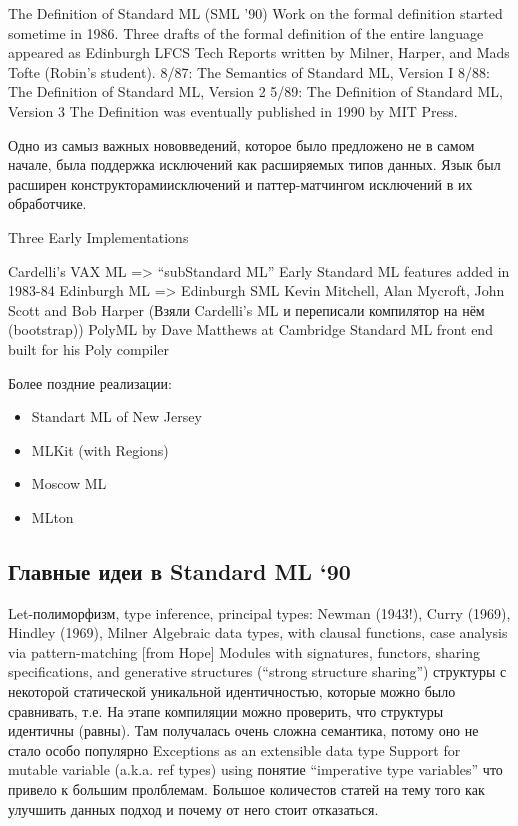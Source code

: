 \documentclass[14pt]{matmex-diploma-custom}
\begin{document}
\begin{itemize}
\begin{itemize}
The Definition of Standard ML (SML ’90)
Work on the formal definition started sometime in 1986. Three drafts of
the formal definition of the entire language appeared as Edinburgh LFCS
Tech Reports written by Milner, Harper, and Mads Tofte (Robin’s student).
8/87: The Semantics of Standard ML, Version I
8/88: The Definition of Standard ML, Version 2
5/89: The Definition of Standard ML, Version 3
The Definition was eventually published in 1990 by MIT Press.

Одно из самыз важных нововведений, которое было предложено не в самом начале, была поддержка исключений как расширяемых типов данных. Язык был расширен конструкторамиисключений и паттер-матчингом исключений в их обработчике. 

Three Early Implementations

Cardelli’s VAX ML => “subStandard ML”
Early Standard ML features added in 1983-84
Edinburgh ML => Edinburgh SML
Kevin Mitchell, Alan Mycroft, John Scott and Bob Harper (Взяли Cardelli’s ML и переписали компилятор на нём (bootstrap))
PolyML by Dave Matthews at Cambridge
Standard ML front end built for his Poly compiler

Более поздние реализации:
\begin{itemize}
 \item Standart ML of New Jersey
 \item MLKit (with Regions)
 \item Moscow ML
 \item MLton
\end{itemize}

\subsection{Главные идеи в  Standard ML ‘90}
Let-полиморфизм, type inference, principal types: Newman (1943!), Curry (1969), Hindley (1969), Milner
Algebraic data types, with clausal functions, case analysis via pattern-matching [from Hope]
Modules with signatures, functors, sharing specifications, and generative structures (“strong structure sharing”) структуры  с  некоторой статической уникальной идентичностью, которые  можно было сравнивать, т.е. На этапе компиляции можно проверить, что структуры идентичны (равны). Там получалась очень сложна семантика, потому оно не стало особо популярно
Exceptions as an extensible data type
Support for mutable variable (a.k.a. ref types) using понятие “imperative type variables” что привело к большим пролблемам. Большое количестов статей на тему того как улучшить данных подход и почему от него стоит отказаться.


\end{itemize}
\end{itemize}
\end{document}
